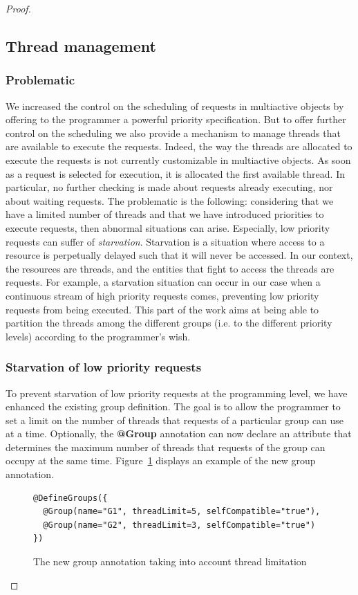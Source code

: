 \documentclass[11pt]{report}
\begin{document}
\begin{proof}
\subsection{Thread management}
\subsubsection{Problematic}
We increased the control on the scheduling of requests in multiactive objects by offering to the programmer a powerful priority specification. But to offer further control on the scheduling we also provide a mechanism to manage threads that are available to execute the requests. Indeed, the way the threads are allocated to execute the requests is not currently customizable in multiactive objects. As soon as a request is selected for execution, it is allocated the first available thread. In particular, no further checking is made about requests already executing, nor about waiting requests. The problematic is the following: considering that we have a limited number of threads and that we have introduced priorities to execute requests, then abnormal situations can arise. Especially, low priority requests can suffer of \emph{starvation}. Starvation is a situation where access to a resource is perpetually delayed such that it will never be accessed. In our context, the resources are threads, and the entities that fight to access the threads are requests. For example, a starvation situation can occur in our case when a continuous stream of high priority requests comes, preventing low priority requests from being executed. 
This part of the work aims at being able to partition the threads among the different groups (i.e. to the different priority levels) according to the programmer's wish. 

\subsubsection{Starvation of low priority requests}
To prevent starvation of low priority requests at the programming level, we have enhanced the existing group definition. The goal is to allow the programmer to set a limit on the number of threads that requests of a particular group can use at a time. Optionally, the \textbf{@Group} annotation can now declare an attribute that determines the maximum number of threads that requests of the group can occupy at the same time. Figure~\ref{fig:new_groups} displays an example of the new group annotation.

\begin{figure}[!ht]
	\lstset{language=java, numbers=left, numberstyle=\tiny, stepnumber=1, numbersep=5pt, basicstyle=\footnotesize}
	\begin{lstlisting}[frame=single]
@DefineGroups({
  @Group(name="G1", threadLimit=5, selfCompatible="true"),
  @Group(name="G2", threadLimit=3, selfCompatible="true")
})
 	\end{lstlisting}
\caption{The new group annotation taking into account thread limitation}
\label{fig:new_groups}
\end{figure}


\end{proof}
\end{document}
